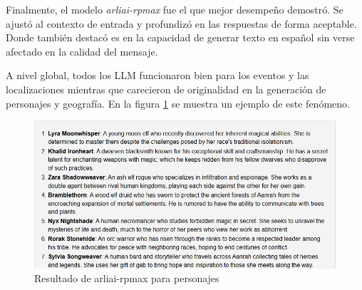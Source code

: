 Finalmente, el modelo \textit{arliai-rpmax} fue el que mejor desempeño demostró. 
Se ajustó al contexto de entrada y profundizó en las respuestas de forma aceptable.
Donde también destacó es en la capacidad de generar texto en español sin verse afectado
en la calidad del mensaje. 

A nivel global, todos los LLM funcionaron bien para los eventos y las localizaciones
mientras que carecieron de originalidad en la generación de personajes y geografía.
En la figura \ref{fig:rpmax-chars} se muestra un ejemplo de este fenómeno.

\begin{figure}[htbp]
	\centering
	\includegraphics[width=1\textwidth]{./Figures/rpmax-noprompt-chars.png}
	\caption{Resultado de arliai-rpmax para personajes}
	\label{fig:rpmax-chars}
\end{figure}